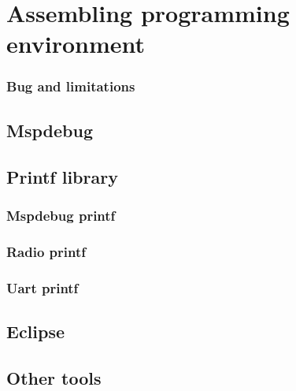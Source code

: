 \chapter{Assembling programming environment}


\subsection{Bug and limitations}


\section{Mspdebug}

\section{Printf library}

\subsection{Mspdebug printf}

\subsection{Radio printf}

\subsection{Uart printf}


 

\section{Eclipse}


\section{Other tools}


